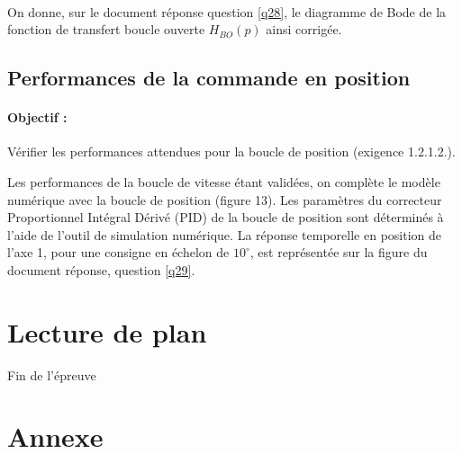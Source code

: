 ~\

On donne, sur le document réponse question \ref{q28}, le diagramme de Bode de la fonction de transfert boucle ouverte $H_{BO}(p)$ ainsi corrigée.


\subsection{Performances de la commande en position}

\paragraph{Objectif :} Vérifier les performances attendues pour la boucle de position (exigence 1.2.1.2.). 

Les performances de la boucle de vitesse étant validées, on complète le modèle numérique avec la boucle de position (figure 13). Les paramètres du correcteur Proportionnel Intégral Dérivé (PID) de la boucle de position sont déterminés à l'aide de l'outil de simulation numérique. La réponse temporelle en position de l'axe 1, pour une consigne en échelon de $10^\circ$, est représentée sur la figure du document réponse, question \ref{q29}.


\section{Lecture de plan}


\vspace{2cm}

\begin{center}
\Huge{Fin de l'épreuve}
\end{center}

\newpage

\section{Annexe}


